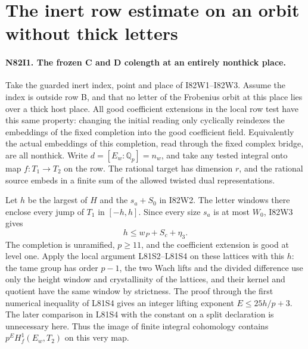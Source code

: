 \section{The inert row estimate on an orbit without thick letters}

\paragraph{N82I1. The frozen C and D colength at an entirely nonthick place.}
Take the guarded inert index, point and place of I82W1--I82W3.
Assume the index is outside row B, and that no letter of the
Frobenius orbit at this place lies over a thick host place.
All good coefficient extensions in the local row test have this
same property: changing the initial reading only cyclically
reindexes the embeddings of the fixed completion into the good
coefficient field. Equivalently the actual embeddings of this
completion, read through the fixed complex bridge, are all nonthick.
Write $d=[E_w:\mathbb Q_p]=n_w$, and take any tested integral
onto map $f:T_1\to T_2$ on the row. The rational target has
dimension $r$, and the rational source embeds in a finite sum
of the allowed twisted dual representations.

Let $h$ be the largest of $H$ and the $s_a+S_0$ in I82W2.
The letter windows there enclose every jump of $T_1$ in $[-h,h]$.
Since every size $s_a$ is at most $W_0$, I82W3 gives
\[
                   h\le w_P+S_c+\eta_3 .
\]
The completion is unramified, $p\ge11$, and the coefficient
extension is good at level one. Apply the local argument
L81S2--L81S4 on these lattices with this $h$: the tame group
has order $p-1$, the two Wach lifts and the divided difference
use only the height window and crystallinity of the lattices,
and their kernel and quotient have the same window by strictness.
The proof through the first numerical inequality of L81S4 gives
an integer lifting exponent $E\le25h/p+3$. The later comparison
in L81S4 with the constant on a split declaration is unnecessary
here. Thus the image of finite integral cohomology contains
$p^E H^1_f(E_w,T_2)$ on this very map.

